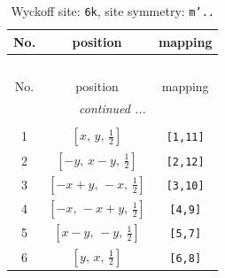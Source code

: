 \documentclass[fleqn,8pt]{jsarticle}
\begin{document}
\renewcommand{\arraystretch}{1.2}
\begin{longtable}{ccc}
\caption{Wyckoff site: {\tt 6k}, site symmetry: {\tt m'..}}
 \\
 \hline \hline
No. & position & mapping \\ \hline \endfirsthead

\multicolumn{2}{l}{\tablename\ \thetable{}} \\
 \hline \hline
No. & position & mapping \\ \hline \endhead

 \hline \hline
\multicolumn{2}{r}{\footnotesize\it continued ...} \\ \endfoot

 \hline \hline
\multicolumn{2}{r}{} \\ \endlastfoot

1 & $\left[ x,\, y,\, \frac{1}{2} \right]$ & {\tt [1,11]} \\ \hline
2 & $\left[ - y,\, x - y,\, \frac{1}{2} \right]$ & {\tt [2,12]} \\ \hline
3 & $\left[ - x + y,\, - x,\, \frac{1}{2} \right]$ & {\tt [3,10]} \\ \hline
4 & $\left[ - x,\, - x + y,\, \frac{1}{2} \right]$ & {\tt [4,9]} \\ \hline
5 & $\left[ x - y,\, - y,\, \frac{1}{2} \right]$ & {\tt [5,7]} \\ \hline
6 & $\left[ y,\, x,\, \frac{1}{2} \right]$ & {\tt [6,8]} \\
\end{longtable}
\renewcommand{\arraystretch}{1.2}
\end{document}
